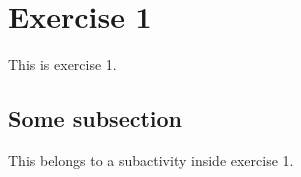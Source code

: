 \section{Exercise 1}

This is exercise 1.

\subsection{Some subsection}

This belongs to a subactivity inside exercise 1.
